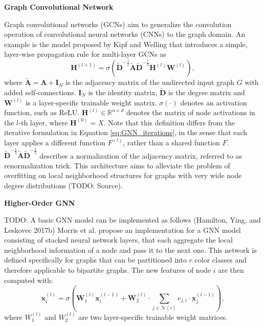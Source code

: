 \textbf{Graph Convolutional Network} \par
Graph convolutional networks (GCNs) aim to generalize the convolution operation of convolutional neural networks (CNNs) to the graph domain. An example is the model proposed by Kipf and Welling \cite{kipf2016semi} that introduces a simple, layer-wise propagation rule for multi-layer GCNs as
\begin{equation}
    \label{eq:GCN}
    \mathbf{H}^{(l+1)} = \sigma(\tilde{\mathbf{D}}^{-\frac{1}{2}}\tilde{\mathbf{A}}\tilde{\mathbf{D}}^{-\frac{1}{2}}\mathbf{H}^{(l)}\mathbf{W}^{(l)}),
\end{equation}
where $\tilde{\mathbf{A}} = \mathbf{A} + \mathbf{I}_N$ is the adjacency matrix of the undirected input graph $G$ with added self-connections. $\mathbf{I}_N$ is the identity matrix, $\tilde{\mathbf{D}}$ is the degree matrix and $\mathbf{W}^{(l)}$ is a layer-specific trainable weight matrix. $\sigma(\cdot)$ denotes an activation function, such as ReLU. $\mathbf{H}^{(l)} \in \mathbb{R}^{n\times d}$ denotes the matrix of node activations in the $l$-th layer, where $\mathbf{H}^{(0)} = X$. Note that this definition differs from the iterative formulation in Equation \ref{eq:GNN_iterations}, in the sense that each layer applies a different function $F^{(l)}$, rather than a shared function $F$. $\tilde{\mathbf{D}}^{-\frac{1}{2}}\tilde{\mathbf{A}}\tilde{\mathbf{D}}^{-\frac{1}{2}}$ describes a normalization of the adjacency matrix, referred to as renormalization trick. This architecture aims to alleviate the problem of overfitting on local neighborhood structures for graphs with very wide node degree distributions (TODO: Source). \bigskip


\textbf{Higher-Order GNN} \par
TODO: A basic GNN model can be implemented as follows (Hamilton, Ying, and Leskovec 2017b)
Morris et al. \cite{morris2019weisfeiler} propose an implementation for a GNN model consisting of stacked neural network layers, that each aggregate the local neighborhood information of a node and pass it to the next one. This network is defined specifically for graphs that can be partitioned into $r$ color classes and therefore applicable to bipartite graphs. The new features of node $i$ are then computed with:
\begin{equation}
    \label{eq:higher-order-gnn}
    \mathbf{x}_i^{(l)} = \sigma(\mathbf{W}_1^{(l)}\mathbf{x}_i^{(l-1)}+\mathbf{W}_2^{(l)}\cdot\sum_{j\in\mathcal{N}(i)}e_{j,i}\cdot \mathbf{x}_j^{(l-1)}),
\end{equation}
where $W_1^{(l)}$ and $W_2^{(l)}$ are two layer-specific trainable weight matrices.

